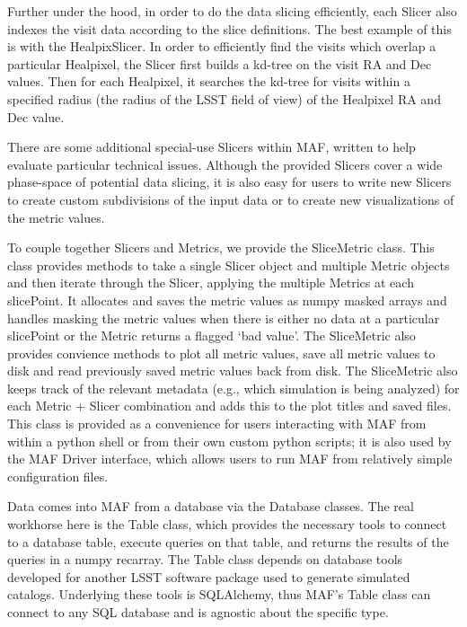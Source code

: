\documentclass[]{spie}  %
\begin{document}
Further under the hood, in order to do the data slicing efficiently,
each Slicer also indexes the visit data according to the slice
definitions. The best example of this is with the HealpixSlicer. In
order to efficiently find the visits which overlap a particular
Healpixel, the Slicer first builds a kd-tree on the visit RA and Dec
values. Then for each Healpixel, it searches the kd-tree for visits
within a specified radius (the radius of the LSST field of view) of
the Healpixel RA and Dec value. 

There are some additional special-use Slicers within MAF, written to
help evaluate particular technical issues. Although the provided
Slicers cover a wide phase-space of potential data slicing, it is
also easy for users to write new Slicers to create custom subdivisions
of the input data or to create new visualizations of the metric
values. 

To couple together Slicers and Metrics, we provide
the SliceMetric class. This class provides methods to take a single
Slicer object and multiple Metric objects and then iterate through the
Slicer, applying the multiple Metrics at each slicePoint. It allocates
and saves the metric values as numpy masked arrays and handles masking
the metric values when there is either no data at a particular
slicePoint or the Metric returns a flagged `bad value'. The
SliceMetric also provides convience methods to plot all metric values,
save all metric values to disk and read previously saved metric values
back from disk. The SliceMetric also keeps track of the relevant
metadata (e.g., which simulation is being analyzed) for each Metric + Slicer combination and adds this to the
plot titles and saved files. This class is provided as a convenience
for users interacting with MAF from within a python shell or from
their own custom python scripts; it is also used by the MAF Driver
interface, which allows users to run MAF from relatively simple
configuration files.

Data comes into MAF from a database via the Database classes. The real
workhorse here is the Table class, which provides the necessary tools
to connect to a database table, execute queries on that table, and
returns the results of the queries in a numpy recarray. The Table
class depends on database tools developed for another LSST software
package used to generate simulated catalogs. Underlying
these tools is SQLAlchemy\cite{sqlalchemy}, thus MAF's Table class can connect to any
SQL database and is agnostic about the specific type.
\end{document}

